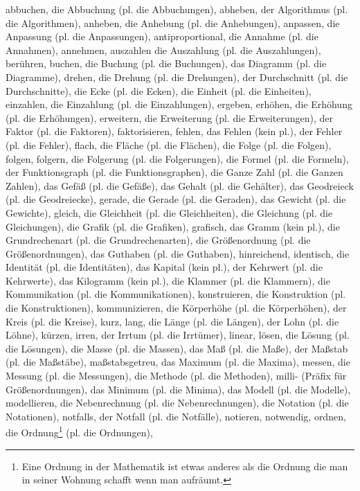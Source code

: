 abbuchen,
die Abbuchung (pl. die Abbuchungen),
abheben,
der Algorithmus (pl. die Algorithmen),
anheben,
die Anhebung (pl. die Anhebungen),
anpassen,
die Anpassung (pl. die Anpassungen),
antiproportional,
die Annahme (pl. die Annahmen),
annehmen,
auszahlen
die Auszahlung (pl. die Auszahlungen),
berühren,
buchen,
die Buchung (pl. die Buchungen),
das Diagramm (pl. die Diagramme),
drehen,
die Drehung (pl. die Drehungen),
der Durchschnitt (pl. die Durchschnitte),
die Ecke (pl. die Ecken),
die Einheit (pl. die Einheiten),
einzahlen,
die Einzahlung (pl. die Einzahlungen),
ergeben,
erhöhen,
die Erhöhung (pl. die Erhöhungen),
erweitern,
die Erweiterung (pl. die Erweiterungen),
der Faktor (pl. die Faktoren),
faktorisieren,
fehlen,
das Fehlen (kein pl.),
der Fehler (pl. die Fehler),
flach,
die Fläche (pl. die Flächen),
die Folge (pl. die Folgen),
folgen,
folgern,
die Folgerung (pl. die Folgerungen),
die Formel (pl. die Formeln),
der Funktionsgraph (pl. die Funktionsgraphen),
die Ganze Zahl (pl. die Ganzen Zahlen),
das Gefäß (pl. die Gefäße),
das Gehalt (pl. die Gehälter),
das Geodreieck (pl. die Geodreiecke),
gerade,
die Gerade (pl. die Geraden),
das Gewicht (pl. die Gewichte),
gleich,
die Gleichheit (pl. die Gleichheiten),
die Gleichung (pl. die Gleichungen),
die Grafik (pl. die Grafiken),
grafisch,
das Gramm (kein pl.),
die Grundrechenart (pl. die Grundrechenarten),
die Größenordnung (pl. die Größenordnungen),
das Guthaben (pl. die Guthaben),
hinreichend,
identisch,
die Identität (pl. die Identitäten),
das Kapital (kein pl.),
der Kehrwert (pl. die Kehrwerte),
das Kilogramm (kein pl.),
die Klammer (pl. die Klammern),
die Kommunikation (pl. die Kommunikationen),
konstruieren,
die Konstruktion (pl. die Konstruktionen),
kommunizieren,
die Körperhöhe (pl. die Körperhöhen),
der Kreis (pl. die Kreise),
kurz,
lang,
die Länge (pl. die Längen),
der Lohn (pl. die Löhne),
kürzen,
irren,
der Irrtum (pl. die Irrtümer),
linear,
lösen,
die Lösung (pl. die Lösungen),
die Masse (pl. die Massen),
das Maß (pl. die Maße),
der Maßstab (pl. die Maßstäbe),
maßstabsgetreu,
das Maximum (pl. die Maxima),
messen,
die Messung (pl. die Messungen),
die Methode (pl. die Methoden),
milli- (Präfix für Größenordnungen),
das Minimum (pl. die Minima),
das Modell (pl. die Modelle),
modellieren,
die Nebenrechnung (pl. die Nebenrechnungen),
die Notation (pl. die Notationen),
notfalls,
der Notfall (pl. die Notfälle),
notieren,
notwendig,
ordnen,
die Ordnung\footnote{Eine Ordnung in der Mathematik ist etwas anderes als die Ordnung die man in seiner Wohnung schafft wenn man aufräumt.} (pl. die Ordnungen),
